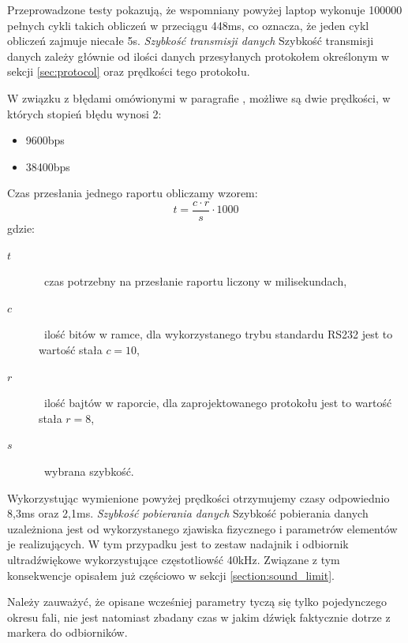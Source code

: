 Przeprowadzone testy pokazują, że wspomniany powyżej laptop wykonuje 100000 pełnych cykli takich obliczeń w przeciągu 448ms, co oznacza, że jeden cykl obliczeń zajmuje niecałe 5\textmu s.
\newline
\newline
\textsl{Szybkość transmisji danych}
Szybkość transmisji danych zależy głównie od ilości danych przesyłanych protokołem określonym w sekcji \ref{sec:protocol} oraz prędkości tego protokołu.

W związku z błędami omówionymi w paragrafie , możliwe są dwie prędkości, w których stopień błędu wynosi 2\textperthousand:
\begin{itemize}
 \item 9600bps
 \item 38400bps
\end{itemize}

Czas przesłania jednego raportu obliczamy wzorem:
\begin{equation}
 t = \frac{c \cdot r}{s} \cdot 1000
\end{equation}
gdzie:
\begin{description}
 \item[$t$] \ppauza~czas potrzebny na przesłanie raportu liczony w milisekundach,
 \item[$c$] \ppauza~ilość bitów w ramce, dla wykorzystanego trybu standardu RS232 jest to wartość stała $c = 10$,
 \item[$r$] \ppauza~ilość bajtów w raporcie, dla zaprojektowanego protokołu jest to wartość stała $r = 8$,
 \item[$s$] \ppauza~wybrana szybkość.
\end{description}

Wykorzystując wymienione powyżej prędkości otrzymujemy czasy odpowiednio 8,3ms oraz 2,1ms.
\newline
\newline
\textsl{Szybkość pobierania danych}
Szybkość pobierania danych uzależniona jest od wykorzystanego zjawiska fizycznego i parametrów elementów je realizujących. W tym przypadku jest to zestaw nadajnik i odbiornik ultradźwiękowe wykorzystujące częstotliowść 40kHz. Związane z tym konsekwencje opisałem już częściowo w sekcji \ref{section:sound_limit}.

Należy zauważyć, że opisane wcześniej parametry tyczą się tylko pojedynczego okresu fali, nie jest natomiast zbadany czas w jakim dźwięk faktycznie dotrze z markera do odbiorników.

